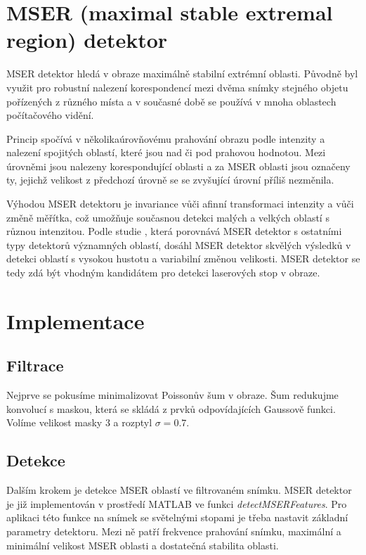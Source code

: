 \section{MSER (maximal stable extremal region) detektor}

MSER detektor hledá v obraze maximálně stabilní extrémní oblasti. Původně byl využit pro robustní nalezení korespondencí mezi dvěma snímky stejného objetu pořízených z různého místa a v současné době se používá v mnoha oblastech počítačového vidění.  

Princip spočívá v několikaúrovňovému prahování obrazu podle intenzity a nalezení spojitých oblastí, které jsou nad či pod prahovou hodnotou. Mezi úrovněmi jsou nalezeny korespondující oblasti a za MSER oblasti jsou označeny ty, jejichž velikost z předchozí úrovně se se zvyšující úrovní příliš nezměnila. 

Výhodou MSER detektoru je invariance vůči afinní transformaci intenzity a vůči změně měřítka, což umožňuje současnou detekci malých a velkých oblastí s různou intenzitou. Podle studie \cite{Comparison}, která porovnává MSER detektor s ostatními typy detektorů významných oblastí, dosáhl MSER detektor skvělých výsledků v detekci oblastí s vysokou hustotu a variabilní změnou velikosti. MSER detektor se tedy zdá být vhodným kandidátem pro detekci laserových stop v obraze.

\section{Implementace}

\subsection{Filtrace}
   Nejprve se pokusíme minimalizovat Poissonův šum v obraze. Šum redukujme konvolucí s maskou, která se skládá z prvků odpovídajících Gaussově funkci. Volíme velikost masky \SI{3}{\px} a rozptyl $\sigma = 0.7$.

\subsection{Detekce} 
   Dalším krokem je detekce MSER oblastí ve filtrovaném snímku. MSER detektor je již implementován v prostředí MATLAB ve funkci \textit{detectMSERFeatures}. Pro aplikaci této funkce na snímek se světelnými stopami je třeba nastavit základní parametry detektoru. Mezi ně patří frekvence prahování snímku, maximální a minimální velikost MSER oblasti a dostatečná stabilita oblasti. 
   
